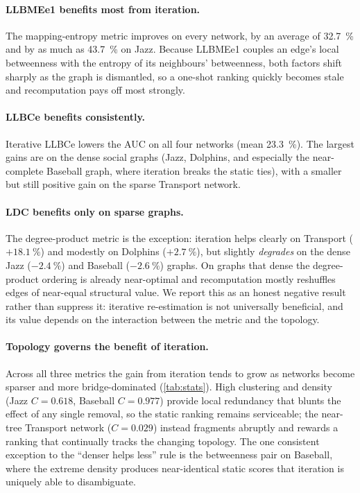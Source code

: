 \documentclass[runningheads,11pt]{article}
\begin{document}
\paragraph{LLBMEe1 benefits most from iteration.}
The mapping-entropy metric improves on every network, by an average of
\SI{32.7}{\percent} and by as much as \SI{43.7}{\percent} on Jazz. Because
LLBMEe1 couples an edge's local betweenness with the entropy of its neighbours'
betweenness, both factors shift sharply as the graph is dismantled, so a
one-shot ranking quickly becomes stale and recomputation pays off most
strongly.

\paragraph{LLBCe benefits consistently.}
Iterative LLBCe lowers the AUC on all four networks (mean \SI{23.3}{\percent}).
The largest gains are on the dense social graphs (Jazz, Dolphins, and especially
the near-complete Baseball graph, where iteration breaks the static ties), with
a smaller but still positive gain on the sparse Transport network.

\paragraph{LDC benefits only on sparse graphs.}
The degree-product metric is the exception: iteration helps clearly on Transport
($+\SI{18.1}{\percent}$) and modestly on Dolphins ($+\SI{2.7}{\percent}$), but
slightly \emph{degrades} on the dense Jazz ($-\SI{2.4}{\percent}$) and Baseball
($-\SI{2.6}{\percent}$) graphs. On graphs that dense the degree-product ordering
is already near-optimal and recomputation mostly reshuffles edges of near-equal
structural value. We report this as an honest negative result rather than
suppress it: iterative re-estimation is not universally beneficial, and its
value depends on the interaction between the metric and the topology.

\paragraph{Topology governs the benefit of iteration.}
Across all three metrics the gain from iteration tends to grow as networks become
sparser and more bridge-dominated (\cref{tab:stats}). High clustering and
density (Jazz $C=0.618$, Baseball $C=0.977$) provide local redundancy that
blunts the effect of any single removal, so the static ranking remains
serviceable; the near-tree Transport network ($C=0.029$) instead fragments
abruptly and rewards a ranking that continually tracks the changing topology.
The one consistent exception to the ``denser helps less'' rule is the
betweenness pair on Baseball, where the extreme density produces near-identical
static scores that iteration is uniquely able to disambiguate.
\end{document}
